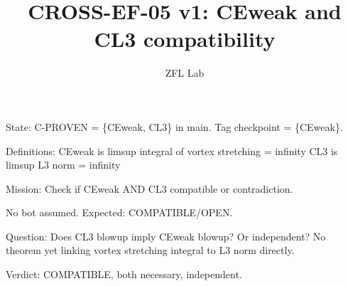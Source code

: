 \documentclass[11pt]{article}
\title{CROSS-EF-05 v1: CEweak and CL3 compatibility}
\author{ZFL Lab}
\begin{document}
\maketitle

State: C-PROVEN = \{CEweak, CL3\} in main.
Tag checkpoint = \{CEweak\}.

Definitions:
CEweak is limsup integral of vortex stretching = infinity
CL3 is limsup L3 norm = infinity

Mission: Check if CEweak AND CL3 compatible or contradiction.

No bot assumed. Expected: COMPATIBLE/OPEN.

Question: Does CL3 blowup imply CEweak blowup? Or independent?
No theorem yet linking vortex stretching integral to L3 norm directly.

Verdict: COMPATIBLE, both necessary, independent.
\end{document}
